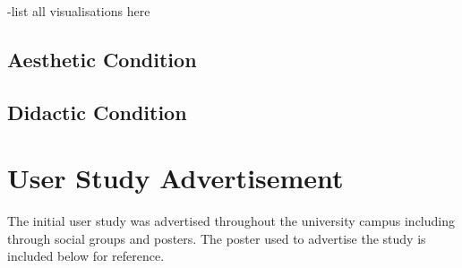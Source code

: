 -list all visualisations here

\section*{Aesthetic Condition}

\section*{Didactic Condition}





\chapter{User Study Advertisement}

The initial user study was advertised throughout the university campus including through social groups and posters. The poster used to advertise the study is included below for reference.

